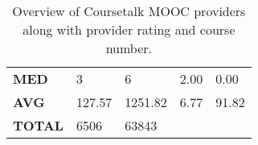 \documentclass[
	a4paper,
	pdftex,
	12pt,	
	footinclude=true,
	fleqn,
	final,
	]{report}%
\begin{document}
\begin{table}[h]
{\begin{tabular}{m{7cm} m{2.3cm} m{2.3cm} m{2.3cm} m{2.3cm}}
\textbf{MED}                  & 3                                                    & 6                                                     & 2.00                                                     & 0.00                                                     \\
\textbf{AVG}                  & 127.57                                               & 1251.82                                               & 6.77                                                     & 91.82                                                    \\ \midrule
\textbf{TOTAL}                & 6506                                                 & 63843                                                 &                                                          &                                                          \\ \bottomrule
\end{tabular}%
}
\caption[Overview of Coursetalk MOOC providers]{\small \centering Overview of Coursetalk MOOC providers along with provider 
rating and course number.}
\label{t:14}
\end{table}
\vspace{-0.5cm}
\end{document}
